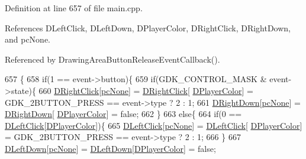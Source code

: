 Definition at line 657 of file main.\+cpp.



References D\+Left\+Click, D\+Left\+Down, D\+Player\+Color, D\+Right\+Click, D\+Right\+Down, and pc\+None.



Referenced by Drawing\+Area\+Button\+Release\+Event\+Callback().


\begin{DoxyCode}
657                                                                                                 \{
658     \textcolor{keywordflow}{if}(1 == event->button)\{
659         \textcolor{keywordflow}{if}(GDK\_CONTROL\_MASK & event->state)\{
660             \hyperlink{classCApplicationData_a845b854113fb8742338ada01af8b9351}{DRightClick}[\hyperlink{GameDataTypes_8h_aafb0ca75933357ff28a6d7efbdd7602fa88767aa8e02c7b3192bbab4127b3d729}{pcNone}] = \hyperlink{classCApplicationData_a845b854113fb8742338ada01af8b9351}{DRightClick}[
      \hyperlink{classCApplicationData_a53550939b20cba70570f113e4d1c5d02}{DPlayerColor}] = GDK\_2BUTTON\_PRESS == \textcolor{keyword}{event}->type ? 2 : 1;
661             \hyperlink{classCApplicationData_a0eb2ef18b6e71e98517f8b813a658164}{DRightDown}[\hyperlink{GameDataTypes_8h_aafb0ca75933357ff28a6d7efbdd7602fa88767aa8e02c7b3192bbab4127b3d729}{pcNone}] = \hyperlink{classCApplicationData_a0eb2ef18b6e71e98517f8b813a658164}{DRightDown}[
      \hyperlink{classCApplicationData_a53550939b20cba70570f113e4d1c5d02}{DPlayerColor}] = \textcolor{keyword}{false};
662         \}
663         \textcolor{keywordflow}{else}\{
664             \textcolor{keywordflow}{if}(0 == \hyperlink{classCApplicationData_a8a86bb4c7cba7b119121401dda4ca68b}{DLeftClick}[\hyperlink{classCApplicationData_a53550939b20cba70570f113e4d1c5d02}{DPlayerColor}])\{
665                 \hyperlink{classCApplicationData_a8a86bb4c7cba7b119121401dda4ca68b}{DLeftClick}[\hyperlink{GameDataTypes_8h_aafb0ca75933357ff28a6d7efbdd7602fa88767aa8e02c7b3192bbab4127b3d729}{pcNone}] = \hyperlink{classCApplicationData_a8a86bb4c7cba7b119121401dda4ca68b}{DLeftClick}[
      \hyperlink{classCApplicationData_a53550939b20cba70570f113e4d1c5d02}{DPlayerColor}] = GDK\_2BUTTON\_PRESS == \textcolor{keyword}{event}->type ? 2 : 1;
666             \}
667             \hyperlink{classCApplicationData_a2b943f18557c3e4c8cd4550e22e028b6}{DLeftDown}[\hyperlink{GameDataTypes_8h_aafb0ca75933357ff28a6d7efbdd7602fa88767aa8e02c7b3192bbab4127b3d729}{pcNone}] = \hyperlink{classCApplicationData_a2b943f18557c3e4c8cd4550e22e028b6}{DLeftDown}[\hyperlink{classCApplicationData_a53550939b20cba70570f113e4d1c5d02}{DPlayerColor}] = \textcolor{keyword}{false};

\end{DoxyCode}
